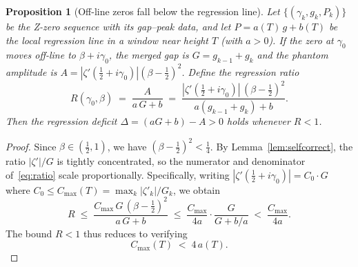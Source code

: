 \documentclass[11pt,a4paper]{article}
\newtheorem{proposition}[theorem]{Proposition}
\begin{document}
\begin{proposition}[Off-line zeros fall below the regression line]\label{prop:deficit}
Let $\{(\gamma_k, g_k, P_k)\}$ be the Z-zero sequence with its gap--peak data, and let $P = a(T)\,g + b(T)$ be the local regression line in a window near height $T$ (with $a > 0$).
If the zero at $\gamma_0$ moves off-line to $\beta + i\gamma_0$, the merged gap is $G = g_{k-1} + g_k$ and the phantom amplitude is $A = |\zeta'(\frac{1}{2}+i\gamma_0)|(\beta-\frac{1}{2})^2$.
Define the \emph{regression ratio}
\begin{equation}\label{eq:ratio}
R(\gamma_0, \beta) \;=\; \frac{A}{a\,G + b} \;=\; \frac{|\zeta'(\tfrac{1}{2}+i\gamma_0)|\,(\beta - \tfrac{1}{2})^2}{a(g_{k-1}+g_k) + b}.
\end{equation}
Then the \emph{regression deficit} $\Delta = (aG+b) - A > 0$ holds whenever $R < 1$.
\end{proposition}

\begin{proof}
Since $\beta \in (\frac{1}{2}, 1)$, we have $(\beta - \frac{1}{2})^2 < \frac{1}{4}$.
By Lemma~\ref{lem:selfcorrect}, the ratio $|\zeta'|/G$ is tightly concentrated, so the numerator and denominator of~\eqref{eq:ratio} scale proportionally.
Specifically, writing $|\zeta'(\frac{1}{2}+i\gamma_0)| = C_0 \cdot G$ where $C_0 \leq C_{\max}(T) = \max_k |\zeta'_k|/G_k$, we obtain
\[
R \;\leq\; \frac{C_{\max}\,G\,(\beta - \tfrac{1}{2})^2}{a\,G + b}
\;\leq\; \frac{C_{\max}}{4a} \cdot \frac{G}{G + b/a}
\;<\; \frac{C_{\max}}{4a}.
\]
The bound $R < 1$ thus reduces to verifying
\begin{equation}\label{eq:key}
C_{\max}(T) \;<\; 4\,a(T).
\end{equation}
\end{proof}
\end{document}
